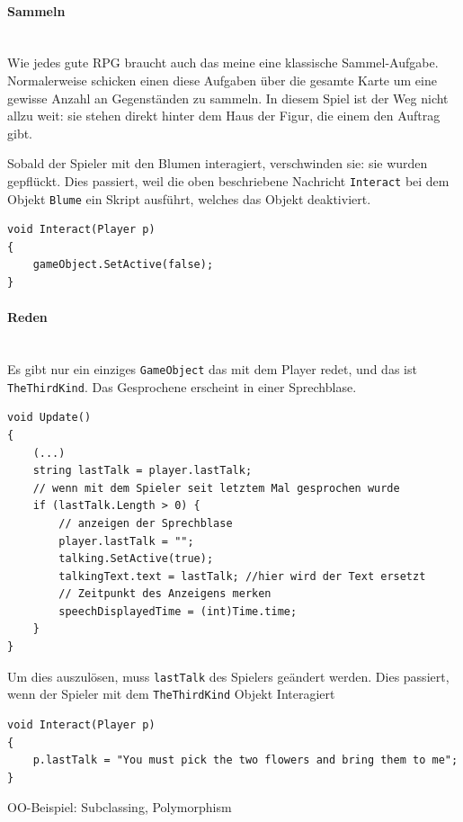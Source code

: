 \paragraph{Sammeln}\mbox{} \\
Wie jedes gute RPG braucht auch das meine eine klassische Sammel-Aufgabe.
Normalerweise schicken einen diese Aufgaben über die gesamte Karte um eine gewisse Anzahl an Gegenständen zu sammeln.
In diesem Spiel ist der Weg nicht allzu weit: sie stehen direkt hinter dem Haus der Figur, die einem den Auftrag gibt.

Sobald der Spieler mit den Blumen interagiert, verschwinden sie: sie wurden gepflückt.
Dies passiert, weil die oben beschriebene Nachricht \lstinline{Interact} bei dem Objekt \lstinline{Blume} ein Skript ausführt, welches das Objekt deaktiviert.
\begin{lstlisting}[caption={Standardimplementation von Interact}]
void Interact(Player p)
{
	gameObject.SetActive(false);
}
\end{lstlisting}
 
\paragraph{Reden}\mbox{} \\
Es gibt nur ein einziges \lstinline{GameObject} das mit dem Player redet, und das ist \lstinline{TheThirdKind}.
 Das Gesprochene erscheint in einer Sprechblase.
 
\begin{lstlisting}[caption={Gesprochenes aktualisieren}]
void Update()
{
	(...)
	string lastTalk = player.lastTalk;
	// wenn mit dem Spieler seit letztem Mal gesprochen wurde
	if (lastTalk.Length > 0) {
		// anzeigen der Sprechblase
		player.lastTalk = "";
		talking.SetActive(true);
		talkingText.text = lastTalk; //hier wird der Text ersetzt
		// Zeitpunkt des Anzeigens merken
		speechDisplayedTime = (int)Time.time;
	} 
}
\end{lstlisting}
Um dies auszulösen, muss \lstinline{lastTalk} des Spielers geändert werden.
Dies passiert, wenn der Spieler mit dem \lstinline{TheThirdKind} Objekt Interagiert 
\begin{lstlisting}
void Interact(Player p)
{
	p.lastTalk = "You must pick the two flowers and bring them to me";
}
\end{lstlisting}


OO-Beispiel: Subclassing, Polymorphism


